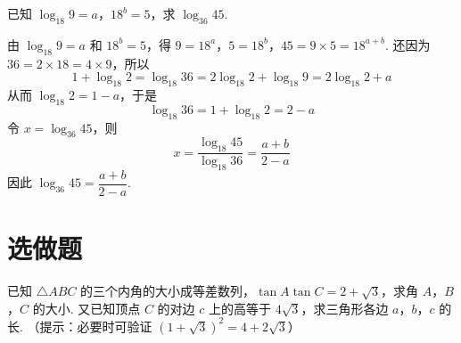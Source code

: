 \documentclass[UTF8,a4paper,oneside,11pt]{ctexbook}
\begin{document}
\begin{problem}
已知 \(\log_{18}9=a\)，\(18^{b}=5\)，求 \(\log_{36}45\).
\end{problem}

\begin{solution}
由 \(\log_{18}9=a\) 和 \(18^{b}=5\)，得
\(9=18^{a}\)，\(5=18^{b}\)，\(45=9\times5=18^{a+b}\).
还因为 \(36=2\times18=4\times9\)，所以
\[
1+\log_{18}2=\log_{18}36=2\log_{18}2+\log_{18}9=2\log_{18}2+a
\]
从而 \(\log_{18}2=1-a\)，于是
\[
\log_{18}36=1+\log_{18}2=2-a
\]
令 \(x=\log_{36}45\)，则
\[
x=\frac{\log_{18}45}{\log_{18}36}=\frac{a+b}{2-a}
\]
因此 \(\log_{36}45=\dfrac{a+b}{2-a}\).
\end{solution}

\section{选做题}

\begin{problem}
已知 \(\triangle ABC\) 的三个内角的大小成等差数列，\(\tan A\tan C=2+\sqrt{3}\)，求角 \(A\)，\(B\)，\(C\) 的大小. 又已知顶点 \(C\) 的对边 \(c\) 上的高等于 \(4\sqrt{3}\)，求三角形各边 \(a\)，\(b\)，\(c\) 的长. （提示：必要时可验证 \((1+\sqrt{3})^{2}=4+2\sqrt{3}\)）
\end{problem}
\end{document}
